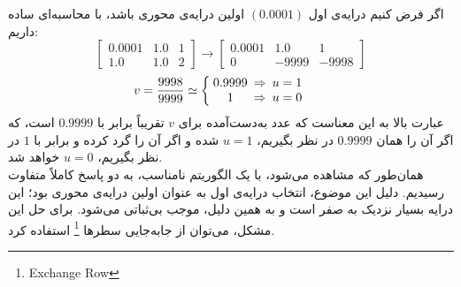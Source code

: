 اگر فرض کنیم درایه‌ی اول $(0.0001)$ اولین درایه‌ی محوری باشد، با محاسبه‌ای ساده داریم:\\
\[\begin{bmatrix}
0.0001 & 1.0 &1\\ 1.0 & 1.0&2
\end{bmatrix} \to 
\begin{bmatrix}
0.0001 & 1.0 &1\\ 0 & -9999&-9998
\end{bmatrix} 
\]
\[v=\frac{9998}{9999} \simeq
\left\{
\arraycolsep.5\arraycolsep
\begin{array}{ccc@{\qquad}l}
0.9999   & \Rightarrow  &  u=1  \\
1         & \Rightarrow  & u=0 
\end{array}
\right. \]
عبارت بالا به این معناست که عدد به‌دست‌آمده برای $v$ تقریباً برابر با $0.9999$ است، که اگر آن را همان $0.9999$ در نظر بگیریم، $u = 1$ شده و اگر آن را گرد کرده و برابر با $1$ در نظر بگیریم، $u = 0$ خواهد شد.\\
همان‌طور که مشاهده می‌شود، با یک الگوریتم نامناسب، به دو پاسخ کاملاً متفاوت رسیدیم. دلیل این موضوع، انتخاب درایه‌ی اول به عنوان اولین درایه‌ی محوری بود؛ این درایه بسیار نزدیک به صفر است و به همین دلیل، موجب بی‌ثباتی می‌شود. برای حل این مشکل، می‌توان از جا‌به‌جایی سطر‌ها \footnote{Exchange Row} استفاده کرد. 

